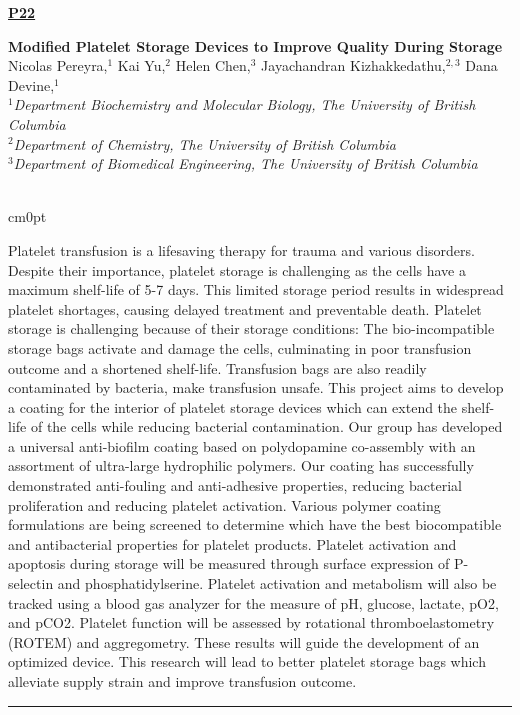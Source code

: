 \documentclass[titlepage,oneside,openany,10pt]{book}
\newenvironment{posterabswfig}[7] %
        {
	\FPeval{\cutw}{clip(16.7-#6)}
	\FPeval{\cutl}{round(#7/0.35+1,3)}
	\begin{flushright}
                \underline{\textbf{#4}}
        \end{flushright}
        \textbf{#1}\\%
        #2\\%
        \textit{#3}\\\\%
        \def\windowpagestuff{\centering
                \texttt{[image: \#5]}
	}
        \opencutright
        \begin{cutout}{0}{\cutw cm}{0pt}{\RoundingUpFunction{\cutl}}
        \noindent
	}
	{
	\end{cutout}
	\noindent\rule{15cm}{0.5pt}%
        }
\begin{document}
\begin{posterabswfig}
	{Modified Platelet Storage Devices to Improve Quality During Storage}
	{Nicolas Pereyra,$^{1}$ Kai Yu,$^{2}$ Helen Chen,$^{3}$ Jayachandran Kizhakkedathu,$^{2,3}$ Dana Devine,$^{1}$}
	{
	$^1$Department Biochemistry and Molecular Biology, The University of British Columbia\\
	$^2$Department of Chemistry, The University of British Columbia\\
	$^3$Department of Biomedical Engineering, The University of British Columbia
	}
	{P22}
	{abstract_figures/Pereyra_Nicolas_Oral.jpg}
	{10.0}
	{5.0}
	Platelet transfusion is a lifesaving therapy for trauma and various disorders. Despite their importance, platelet storage is challenging as the cells have a maximum shelf-life of 5-7 days. This limited storage period results in widespread platelet shortages, causing delayed treatment and preventable death. Platelet storage is challenging because of their storage conditions: The bio-incompatible storage bags activate and damage the cells, culminating in poor transfusion outcome and a shortened shelf-life. Transfusion bags are also readily contaminated by bacteria, make transfusion unsafe. This project aims to develop a coating for the interior of platelet storage devices which can extend the shelf-life of the cells while reducing bacterial contamination. Our group has developed a universal anti-biofilm coating based on polydopamine co-assembly with an assortment of ultra-large hydrophilic polymers. Our coating has successfully demonstrated anti-fouling and anti-adhesive properties, reducing bacterial proliferation and reducing platelet activation. Various polymer coating formulations are being screened to determine which have the best biocompatible and antibacterial properties for platelet products. Platelet activation and apoptosis during storage will be measured through surface expression of P-selectin and phosphatidylserine. Platelet activation and metabolism will also be tracked using a blood gas analyzer for the measure of pH, glucose, lactate, pO2, and pCO2. Platelet function will be assessed by rotational thromboelastometry (ROTEM) and aggregometry. These results will guide the development of an optimized device. This research will lead to better platelet storage bags which alleviate supply strain and improve transfusion outcome.
	\label{PereyraN}
\end{posterabswfig}
\end{document}
